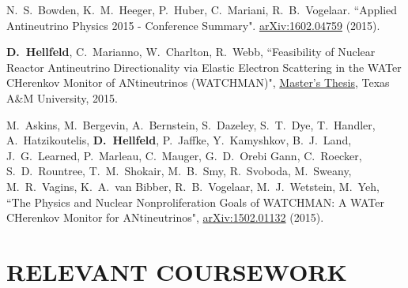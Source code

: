 \documentclass[margin, 10pt]{style/res} %
\begin{document}
\begin{resume}
\begin{thebibliography}{3}
 N.~S.~Bowden, K.~M.~Heeger, P.~Huber, C.~Mariani, R.~B.~Vogelaar. ``Applied Antineutrino Physics 2015 - Conference Summary". \href{http://arxiv.org/abs/1602.04759}{arXiv:1602.04759} (2015).

 \textbf{D.~Hellfeld}, C.~Marianno, W.~Charlton, R.~Webb, ``Feasibility of Nuclear Reactor Antineutrino Directionality via Elastic Electron Scattering in the WATer CHerenkov Monitor of ANtineutrinos (WATCHMAN)", \href{http://hdl.handle.net/1969.1/155140}{Master's Thesis}, Texas A\&M University, 2015.

 M.~Askins, M.~Bergevin, A.~Bernstein, S.~Dazeley, S.~T.~Dye, T.~Handler, A.~Hatzikoutelis, \textbf{D.~Hellfeld}, P.~Jaffke, Y.~Kamyshkov, B.~J.~Land, J.~G.~Learned, P.~Marleau, C.~Mauger, G.~D.~Orebi Gann, C.~Roecker, S.~D.~Rountree, T.~M.~Shokair, M.~B.~Smy, R.~Svoboda, M.~Sweany, M.~R.~Vagins, K.~A.~van Bibber, R.~B.~Vogelaar, M.~J.~Wetstein, M.~Yeh, ``The Physics and Nuclear Nonproliferation Goals of WATCHMAN: A WATer CHerenkov Monitor for ANtineutrinos", \href{http://arxiv.org/pdf/1502.01132.pdf}{arXiv:1502.01132} (2015).

\end{thebibliography}




\section{\small{RELEVANT COURSEWORK}}


\end{resume}
\end{document}
